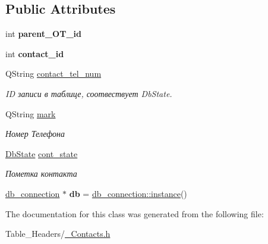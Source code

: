 \subsection*{Public Attributes}
\begin{DoxyCompactItemize}
\item 
\mbox{\label{class_contacts_a2ed9353c63412b3d671e02353bd59e73}} 
int {\bfseries parent\+\_\+\+O\+T\+\_\+id}
\item 
\mbox{\label{class_contacts_a801a02f64adab309e24311f47fc98a67}} 
int {\bfseries contact\+\_\+id}
\item 
\mbox{\label{class_contacts_ad3a3db4887b6a937f4afa14de7a2f4c7}} 
Q\+String \mbox{\hyperlink{class_contacts_ad3a3db4887b6a937f4afa14de7a2f4c7}{contact\+\_\+tel\+\_\+num}}
\begin{DoxyCompactList}\small\item\em ID записи в таблице, соотвествует Db\+State. \end{DoxyCompactList}\item 
\mbox{\label{class_contacts_afd8d015a6fe35955cc13e845af127e9a}} 
Q\+String \mbox{\hyperlink{class_contacts_afd8d015a6fe35955cc13e845af127e9a}{mark}}
\begin{DoxyCompactList}\small\item\em Номер Телефона \end{DoxyCompactList}\item 
\mbox{\label{class_contacts_af34757e1504c51d403cf8fdca700b383}} 
\mbox{\hyperlink{___contacts_8h_ad709f09dcd44386da4fec847f603fa4c}{Db\+State}} \mbox{\hyperlink{class_contacts_af34757e1504c51d403cf8fdca700b383}{cont\+\_\+state}}
\begin{DoxyCompactList}\small\item\em Пометка контакта \end{DoxyCompactList}\item 
\mbox{\label{class_contacts_ac6fef0ccb7ad47ba1bb4b07ca2f5e9b6}} 
\mbox{\hyperlink{classdb__connection}{db\+\_\+connection}} $\ast$ {\bfseries db} = \mbox{\hyperlink{classdb__connection_af3dfe3178795ed64ea06721733a07a8a}{db\+\_\+connection\+::instance}}()
\end{DoxyCompactItemize}


The documentation for this class was generated from the following file\+:\begin{DoxyCompactItemize}
\item 
Table\+\_\+\+Headers/\mbox{\hyperlink{___contacts_8h}{\+\_\+\+Contacts.\+h}}\end{DoxyCompactItemize}
